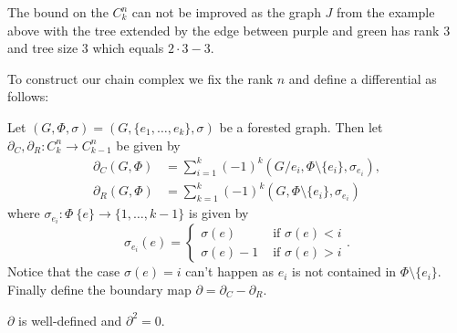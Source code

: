 \begin{remark}
	The bound on the $C_{k}^{n}$ can not be improved as the graph $J$ from the example above with the tree extended by the edge between purple and green has rank $3$ and
	tree size $3$ which equals $2 \cdot 3 -3$.
\end{remark}

To construct our chain complex we fix the rank $n$ and define a differential as follows:
\begin{definition}
	Let $(G,\Phi,\sigma) = (G, \{e_1,\ldots,e_{k}\},\sigma)$ be a forested graph. Then let $\partial_{C}, \partial_{R}: C_{k}^{n} \to C_{k-1}^{n}$ be given by
	\begin{align*}
		\partial_{C}(G,\Phi) &= \sum_{i = 1}^{k} (-1)^{k} (G / e_{i}, \Phi \setminus \{e_{i}\}, \sigma_{e_{i}}),\\
		\partial _{R}(G,\Phi) &= \sum_{k = 1}^{k} (-1)^{k} (G,\Phi \setminus \{e_{i}\}, \sigma_{e_{i}}) 
	\end{align*}
	where $\sigma_{e_{i}}: \Phi \ \{e\} \to \{1,\ldots,k-1\}$ is given by
	\[
		\sigma_{e_{i}}(e) = \begin{cases}
			\sigma(e) & \text{ if }\sigma(e) < i\\
			\sigma(e) - 1 & \text{ if } \sigma(e) > i
		\end{cases}
	.\]
	Notice that the case $\sigma(e) = i$ can't happen as $e_{i}$ is not contained in $\Phi \setminus \{e_{i}\}$. 
	Finally define the boundary map $\partial = \partial_{C} - \partial_{R}$.
\end{definition}

\begin{proposition}
	$\partial$ is well-defined and $\partial^2 = 0$.
\end{proposition}


